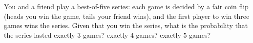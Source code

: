 You and a friend play a best-of-five series: each game is decided by a fair coin flip (heads you win the game, tails your friend wins), and the first player to win three games wins the series. Given that you win the series, what is the probability that the series lasted exactly $3$ games? exactly $4$ games? exactly $5$ games?
